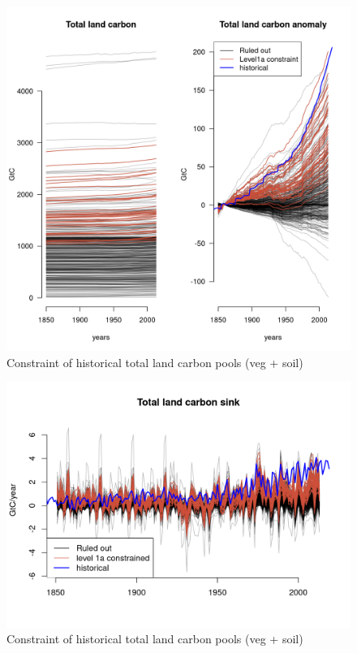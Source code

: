 \documentclass[gmd, manuscript]{copernicus}
\begin{document}

\begin{figure}[t]
\includegraphics[width=12cm]{./graphics/total-land-carbon-change-1.png}
\caption{Constraint of historical total land carbon pools (veg + soil)}
\label{fig:total-land-carbon-change-1}
\end{figure}

\begin{figure}[t]
\includegraphics[width=12cm]{./graphics/total-land-carbon-sink-1.png}
\caption{Constraint of historical total land carbon pools (veg + soil)}
\label{fig:total-land-carbon-sink-1}
\end{figure}
\end{document}
